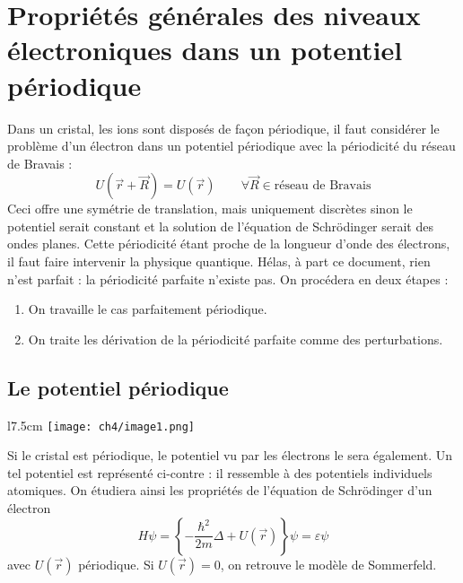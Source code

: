 \setcounter{chapter}{3}
\chapter{Propriétés générales des niveaux électroniques dans un 
potentiel périodique}
Dans un cristal, les ions sont disposés de façon périodique, il faut 
considérer le problème d'un électron dans un potentiel périodique 
avec la périodicité du réseau de Bravais :
\begin{equation}
U(\vec{r}+\vec{R}) = U(\vec{r})\qquad\forall\vec{R} \in \text{réseau 
de Bravais}
\end{equation}
Ceci offre une symétrie de translation, mais uniquement discrètes 
sinon le potentiel serait constant et la solution de l'équation 
de Schrödinger serait des ondes planes. Cette périodicité étant proche de 
la longueur d'onde des électrons, il faut faire intervenir la physique 
quantique. Hélas, à part ce document, rien n'est parfait : la 
périodicité parfaite n'existe pas. On procédera en deux étapes :
\begin{enumerate}
\item On travaille le cas parfaitement périodique.
\item On traite les dérivation de la périodicité parfaite comme des 
perturbations.
\end{enumerate}

	\section{Le potentiel périodique}
	\begin{wrapfigure}[10]{l}{7.5cm}
	\vspace{-0.5cm}
	\texttt{[image: ch4/image1.png]}
	\end{wrapfigure}
	Si le cristal est périodique, le potentiel vu par les électrons 
	le sera également. Un tel potentiel est représenté ci-contre : 
	il ressemble à des potentiels individuels atomiques. On étudiera 
	ainsi les propriétés de l'équation de Schrödinger d'un électron 
	\begin{equation}
	H\psi = \left\{-\frac{\hbar^2}{2m}\Delta + U(\vec{r})\right\}\psi 
	= \varepsilon\psi
	\label{eq:Schod}
	\end{equation}
	avec $U(\vec{r})$ périodique. Si $U(\vec{r})=0$, on retrouve le 
	modèle de Sommerfeld.
	

